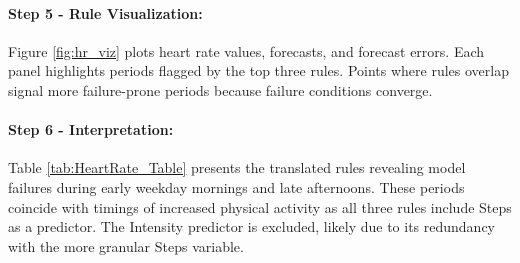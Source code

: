 \documentclass[12pt]{article}
\begin{document}
\paragraph{Step 5 - Rule Visualization:}
Figure \ref{fig:hr_viz} plots heart rate values, forecasts, and forecast errors. Each panel highlights periods flagged by the top three rules. Points where rules overlap signal more failure-prone periods because failure conditions converge.

\paragraph{Step 6 - Interpretation:}
Table \ref{tab:HeartRate_Table} presents the translated rules revealing model failures during early weekday mornings and late afternoons. These  periods coincide with timings of increased physical activity as all three rules include Steps as a predictor. The Intensity predictor is excluded, likely due to its redundancy with the more granular Steps variable.
\end{document}
